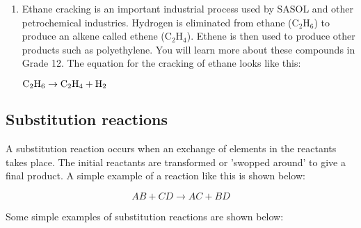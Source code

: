 \begin{enumerate}
{%
%
%

}

\item{Ethane cracking is an important industrial process used by SASOL and other petrochemical industries. Hydrogen is eliminated from ethane (C$_{2}$H$_{6}$) to produce an alkene called ethene (C$_{2}$H$_{4}$). Ethene is then used to produce other products such as polyethylene. You will learn more about these compounds in Grade 12. The equation for the cracking of ethane looks like this:

\begin{center}
$\rm{C_{2}H_{6} \rightarrow C_{2}H_{4} + H_{2}}$
\end{center}
}

\end{enumerate}

\subsection{Substitution reactions}

A substitution reaction occurs when an exchange of elements in the reactants takes place. The initial reactants are transformed or 'swopped around' to give a final product. A simple example of a reaction like this is shown below:

\begin{equation*}
AB + CD \rightarrow AC + BD
\end{equation*}

Some simple examples of substitution reactions are shown below:

